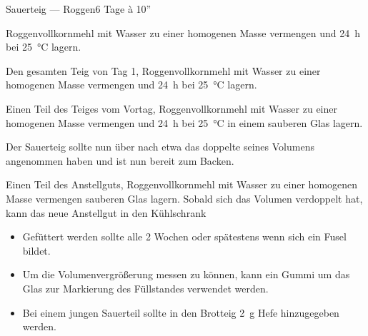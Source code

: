 \begin{MyRecipe}{Sauerteig --- Roggen}{}{6 Tage à 10''}
	
	
	Roggenvollkornmehl mit Wasser zu einer homogenen Masse vermengen und \SI{24}{\hour} bei \SI{25}{\degreeCelsius} lagern.\par\bigskip
	
	
	Den gesamten Teig von Tag 1, Roggenvollkornmehl mit Wasser zu einer homogenen Masse vermengen und \SI{24}{\hour} bei \SI{25}{\degreeCelsius} lagern.\par\bigskip
	
	
	Einen Teil des Teiges vom Vortag, Roggenvollkornmehl mit Wasser zu einer homogenen Masse vermengen und \SI{24}{\hour} bei \SI{25}{\degreeCelsius} in einem sauberen Glas lagern.\par\bigskip
	
	Der Sauerteig sollte nun über nach etwa das doppelte seines Volumens angenommen haben und ist nun bereit zum Backen.\par\bigskip
	

	Einen Teil des Anstellguts, Roggenvollkornmehl mit Wasser zu einer homogenen Masse vermengen sauberen Glas lagern. Sobald sich das Volumen verdoppelt hat, kann das neue Anstellgut in den Kühlschrank\par\bigskip
	
	\begin{itemize}
		\item Gefüttert werden sollte alle 2 Wochen oder spätestens wenn sich ein Fusel bildet.
		\item Um die Volumenvergrößerung messen zu können, kann ein Gummi um das Glas zur Markierung des Füllstandes verwendet werden.
		\item Bei einem jungen Sauerteil sollte in den Brotteig \SI{2}{\gram} Hefe hinzugegeben werden.
	\end{itemize}
	
	
	
\end{MyRecipe}